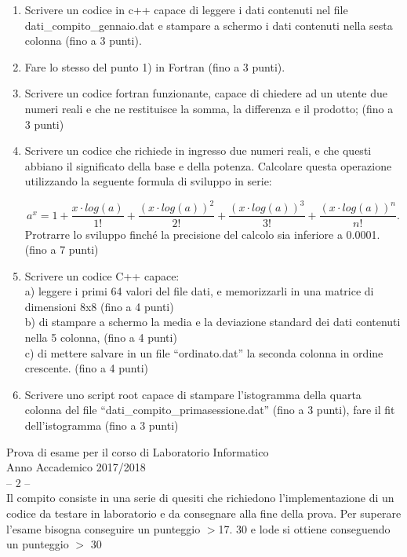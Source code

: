 \documentclass[11pt,fleqn]{book} %
\begin{document}
\begin{enumerate}
\item Scrivere un codice in c++ capace di  leggere i dati contenuti nel file  dati\_compito\_gennaio.dat e stampare a schermo i dati contenuti nella sesta colonna (fino a 3 punti).

\item Fare lo stesso del punto 1) in Fortran (fino a 3 punti).

\item Scrivere un codice fortran funzionante, capace di chiedere ad un utente due numeri reali e che ne restituisce la somma, la differenza e il prodotto; (fino a 3  punti)

\item Scrivere un codice che richiede in ingresso due numeri reali, e che questi abbiano il significato della base e della potenza. Calcolare questa operazione utilizzando la seguente formula di sviluppo in serie:\vspace{-0.5 cm}

$$ a^x =  1 + \frac{x\cdot log(a)}{1!} + \frac{{(x\cdot log(a))}^2}{2!} + \frac{{(x\cdot log(a))}^3}{3!} + \frac{{(x\cdot log(a))}^n}{n!}.
$$
Protrarre lo sviluppo finché la precisione del calcolo sia inferiore a 0.0001. (fino a 7 punti)  

\item Scrivere un codice C++ capace:\\
     a) leggere i primi 64 valori del file dati, e memorizzarli in una matrice di dimensioni 8x8   (fino a 4 punti)\\
     b) di stampare a schermo la media e la deviazione standard dei dati contenuti nella 5 colonna, (fino a 4 punti)\\
     c) di mettere salvare in un file “ordinato.dat” la seconda colonna in ordine crescente. (fino a 4 punti)

\item Scrivere uno script  root capace di stampare l’istogramma della quarta colonna del file ``dati\_compito\_primasessione.dat'' (fino a 3 punti), fare il fit dell’istogramma  (fino a 3 punti)


\end{enumerate}

\newpage
\thispagestyle{empty}
{
\Large\centering
Prova di esame per il corso di Laboratorio Informatico\\		
Anno Accademico 2017/2018\\
-- 2 --\\
}
{
\small\centering
Il compito consiste in una serie di quesiti che richiedono l’implementazione di un codice da testare in laboratorio e da consegnare alla fine della prova. Per superare l’esame bisogna conseguire un punteggio $>$17.  
30 e lode si ottiene conseguendo un punteggio $>$ 30
}
\end{document}

